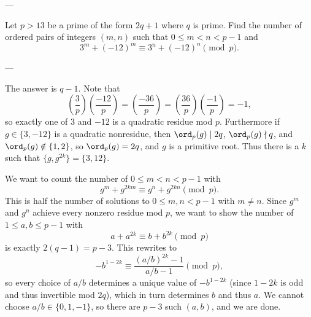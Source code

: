 
---

Let $p>13$ be a prime of the form $2q+1$ where $q$ is prime. Find the number of ordered pairs of integers $(m,n)$ such that $0\le m<n<p-1$ and \[3^m+(-12)^m\equiv3^n+(-12)^n\pmod p.\]

---

The answer is $q-1$. Note that \[\left(\frac3p\right)\left(\frac{-12}p\right)=\left(\frac{-36}p\right)=\left(\frac{36}p\right)\left(\frac{-1}p\right)=-1,\]
so exactly one of $3$ and $-12$ is a quadratic residue mod $p$. Furthermore if $g\in\{3,-12\}$ is a quadratic nonresidue, then $\ord_p(g)\mid2q$, $\ord_p(g)\nmid q$, and $\ord_p(g)\notin\{1,2\}$, so $\ord_p(g)=2q$, and $g$ is a primitive root. Thus there is a $k$ such that $\{g,g^{2k}\}=\{3,12\}$.

We want to count the number of $0\le m<n<p-1$ with \[g^m+g^{2km}\equiv g^n+g^{2kn}\pmod p.\]
This is half the number of solutions to $0\le m,n<p-1$ with $m\ne n$. Since $g^m$ and $g^n$ achieve every nonzero residue mod $p$, we want to show the number of $1\le a,b\le p-1$ with \[a+a^{2k}\equiv b+b^{2k}\pmod p\]
is exactly $2(q-1)=p-3$. This rewrites to \[-b^{1-2k}\equiv\frac{(a/b)^{2k}-1}{a/b-1}\pmod p,\]
so every choice of $a/b$ determines a unique value of $-b^{1-2k}$ (since $1-2k$ is odd and thus invertible mod $2q$), which in turn determines $b$ and thus $a$. We cannot choose $a/b\in\{0,1,-1\}$, so there are $p-3$ such $(a,b)$, and we are done.
